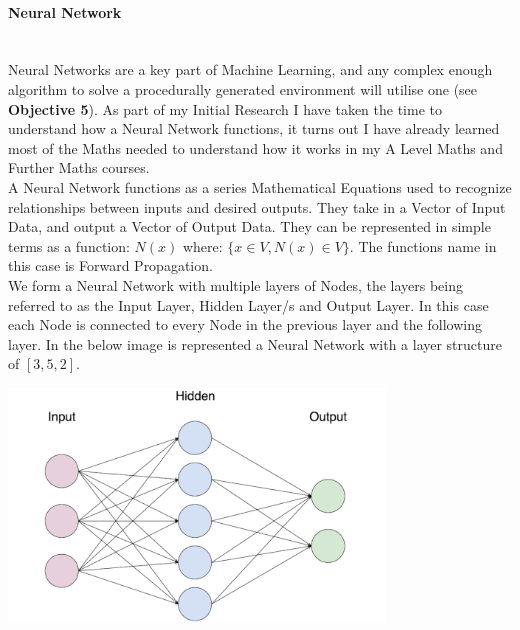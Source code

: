 \begin{flushleft}
                \paragraph{Neural Network} \mbox{} \\
                    Neural Networks are a key part of Machine Learning, and any complex enough algorithm to solve a procedurally 
                    generated environment will utilise one (see \textbf{Objective 5}). As part of my Initial Research I have taken the time to understand 
                    how a Neural Network functions, it turns out I have already learned most of the Maths needed to understand 
                    how it works in my A Level Maths and Further Maths courses. \\
                    \vspace{0.2cm}
                    A Neural Network functions as a series Mathematical Equations used to recognize relationships between inputs
                    and desired outputs. They take in a Vector of Input Data, and output a Vector of Output Data. They can be represented
                    in simple terms as a function: $N(x)$ where: $\{x \in V, N(x) \in V\}$.
                    The functions name in this case is Forward Propagation. \\
                    \vspace{0.2cm}
                    We form a Neural Network with multiple layers of Nodes, the layers being referred to as the Input Layer, 
                    Hidden Layer/s and Output Layer. In this case each Node is connected to every Node in the previous layer and
                    the following layer. In the below image is represented a Neural Network with a layer structure of $[3, 5, 2]$.

                    \vspace{0.1cm}
                    \centerline{\includegraphics[width=10cm]{Images/InitialResearch/NeuralNetworkExample.png}}


\end{flushleft}
